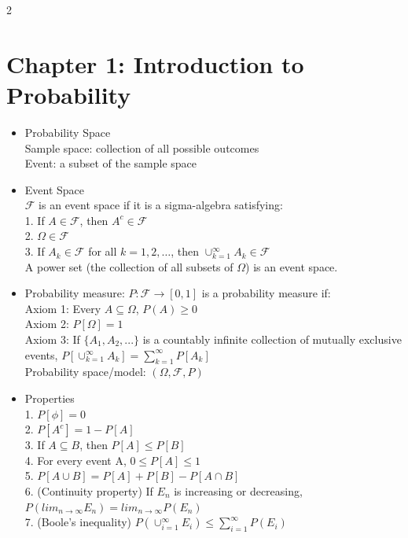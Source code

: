 \documentclass[a4paper,10pt]{article}
\begin{document}
\begin{multicols}{2}
\small


\section*{Chapter 1: Introduction to Probability}
\begin{itemize}
    \item Probability Space\\
    Sample space: collection of all possible outcomes\\
    Event: a subset of the sample space
    \item Event Space\\
    $\mathcal{F}$ is an event space if it is a sigma-algebra satisfying:\\
    1. If $A\in \mathcal{F}$, then $A^c\in \mathcal{F}$\\
    2. $\Omega \in \mathcal{F}$\\
    3. If $A_k \in \mathcal{F}$ for all $k=1,2,\ldots$, then $\cup_{k=1}^\infty A_k\in \mathcal{F}$\\
    A power set (the collection of all subsets of $\Omega$) is  an event space.
    \item Probability measure: $P:\mathcal{F}\to [0,1]$ is a probability measure if:\\
    Axiom 1: Every $A\subseteq \Omega$, $P(A)\ge 0$\\
    Axiom 2: $P[\Omega]=1$\\
    Axiom 3: If $\{A_1,A_2,...\}$ is a countably infinite collection of mutually exclusive events, $P[\cup_{k=1}^\infty A_k]=\sum_{k=1}^\infty P[A_k]$\\
    Probability space/model: $(\Omega,\mathcal{F},P)$
    \item Properties\\
    1. $P[\phi]=0$\\
    2. $P[A^c]=1-P[A]$\\
    3. If $A\subseteq B$, then $P[A]\le P[B]$\\
    4. For every event A, $0\le P[A]\le 1$\\
    5. $P[A\cup B]=P[A]+P[B]-P[A\cap B]$\\
    6. (Continuity property) If $E_n$ is increasing or decreasing,\\ $P(lim_{n\to \infty}E_n)=lim_{n\to \infty}P(E_n)$\\
    7. (Boole's inequality) $P(\cup_{i=1}^\infty E_i)\le \sum_{i=1}^\infty P(E_i)$
\end{itemize}


\end{multicols}
\end{document}
